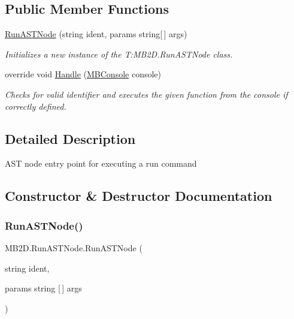 \subsection*{Public Member Functions}
\begin{DoxyCompactItemize}
\item 
\hyperlink{class_m_b2_d_1_1_run_a_s_t_node_a6be1d2f2ae20f5fffefb414c40d15c70}{Run\+A\+S\+T\+Node} (string ident, params string\mbox{[}$\,$\mbox{]} args)
\begin{DoxyCompactList}\small\item\em Initializes a new instance of the T\+:\+M\+B2\+D.\+Run\+A\+S\+T\+Node class. \end{DoxyCompactList}\item 
override void \hyperlink{class_m_b2_d_1_1_run_a_s_t_node_a20845d86608c81357f4347c29dcaf2c8}{Handle} (\hyperlink{class_m_b2_d_1_1_m_b_console}{M\+B\+Console} console)
\begin{DoxyCompactList}\small\item\em Checks for valid identifier and executes the given function from the console if correctly defined. \end{DoxyCompactList}\end{DoxyCompactItemize}


\subsection{Detailed Description}
A\+ST node entry point for executing a run command 



\subsection{Constructor \& Destructor Documentation}
\hypertarget{class_m_b2_d_1_1_run_a_s_t_node_a6be1d2f2ae20f5fffefb414c40d15c70}{}\label{class_m_b2_d_1_1_run_a_s_t_node_a6be1d2f2ae20f5fffefb414c40d15c70} 
\subsubsection{\texorpdfstring{Run\+A\+S\+T\+Node()}{RunASTNode()}}
{\footnotesize\ttfamily M\+B2\+D.\+Run\+A\+S\+T\+Node.\+Run\+A\+S\+T\+Node (\begin{DoxyParamCaption}\item[{string}]{ident,  }\item[{params string \mbox{[}$\,$\mbox{]}}]{args }\end{DoxyParamCaption})\hspace{0.3cm}{\ttfamily [inline]}}



